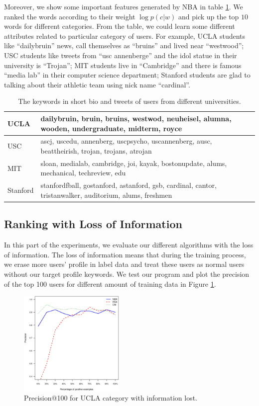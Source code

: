 \documentclass{article}
\begin{document}
Moreover, we show some important features generated by NBA in table \ref{tab:keyword}. We ranked the words according to their weight $\log p(c|w)$ and pick up the top $10$ words for different categories. From the table, we could learn some different attributes related to particular category of users. For example, UCLA students like ``dailybruin'' news, call themselves as ``bruins'' and lived near ``westwood''; USC students like tweets from ``usc annenberge'' and the idol statue in their university is ``Trojan''; MIT students live in ``Cambridge'' and there is famous ``media lab'' in their computer science department; Stanford students are glad to talking about their athletic team using nick name ``cardinal''.

\begin{table}[htb!]
\centering
\begin{tabular}{|l|l|}
\hline
UCLA & dailybruin, bruin, bruins, westwod, neuheisel, alumna, wooden, undergraduate, midterm, royce \\
\hline
USC & ascj, uscedu, annenberg, uscpsycho, uscannenberg, ausc, beattheirish, trojan, trojans, atrojan \\
\hline
MIT & sloan, medialab, cambridge, joi, kayak, bostonupdate, alums, mechanical, techreview, edu \\
\hline
Stanford & stanfordfball, gostanford, astanford, gsb, cardinal, cantor, tristanwalker, auditorium, alums, freshmen \\
\hline
\end{tabular}
\caption{The keywords in short bio and tweets of users from different universities.}\label{tab:keyword}
\end{table}

\subsection{Ranking with Loss of Information}
In this part of the experiments, we evaluate our different algorithms with the loss of information. The loss of information means that during the training process, we erase more users' profile in label data and treat these users as normal users without our target profile keywords. We test our program and plot the precision of the top 100 users for different amount of training data in Figure \ref{fig:e3}.

\begin{figure}[h]
\centering
\includegraphics[width=0.45\textwidth]{experiment/e2.ucla.eps}
\caption{Precision@100 for UCLA category with information lost.}
\label{fig:e3}
\end{figure}
\end{document}
